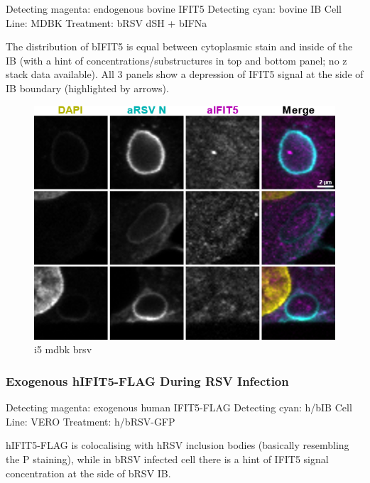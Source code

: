 Detecting magenta: endogenous bovine IFIT5 \newline
Detecting cyan: bovine IB \newline
Cell Line: MDBK \newline
Treatment: bRSV dSH + bIFNa \newline

The distribution of bIFIT5 is equal between cytoplasmic stain and inside of the IB (with a hint of concentrations/substructures in top and bottom panel; no z stack data available). All 3 panels show a depression of IFIT5 signal at the side of IB boundary (highlighted by arrows).

\begin{figure}
    \centering
    \includegraphics[width=1\linewidth]{09. Chapter 4/Figs/05. IFIT5/04. mdbk brsv.png}
    \caption[i5 mdbk brsv]{i5 mdbk brsv}
    \label{fig:i5 mdbk brsv}
\end{figure}

\subsubsection{Exogenous hIFIT5-FLAG During RSV Infection} \label{Exogenous hIFIT5-FLAG During RSV Infection}
Detecting magenta: exogenous human IFIT5-FLAG \newline
Detecting cyan: h/bIB \newline
Cell Line: VERO \newline
Treatment: h/bRSV-GFP \newline

hIFIT5-FLAG is colocalising with hRSV inclusion bodies (basically resembling the P staining), while in bRSV infected cell there is a hint of IFIT5 signal concentration at the side of bRSV IB.

